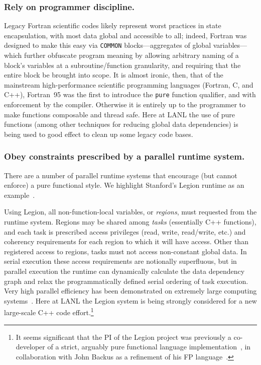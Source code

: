 \documentclass{llncs}
\begin{document}
\subsubsection{Rely on programmer discipline.}
Legacy Fortran scientific codes likely represent worst practices in state
encapsulation, with most data global and accessible to all; indeed, Fortran
was designed to make this easy via \texttt{COMMON} blocks---aggregates of
global variables---which further obfuscate program meaning by allowing
arbitrary naming of a block's variables at a subroutine/function granularity,
and requiring that the entire block be brought into scope.  It is almost
ironic, then, that of the mainstream high-performance scientific programming
languages (Fortran, C, and C++), Fortran~95 was the first to introduce the
\texttt{pure} function qualifier, and with enforcement by the compiler.
Otherwise it is entirely up to the programmer to make functions composable and
thread safe.  Here at LANL the use of pure functions (among other techniques
for reducing global data dependencies) is being used to good effect to clean
up some legacy code bases.

\subsubsection{Obey constraints prescribed by a parallel runtime system.}
There are a number of parallel runtime systems that encourage (but cannot
enforce) a pure functional style.  We highlight Stanford's Legion
runtime as an example~\cite{Bauer12}.

Using Legion, all non-function-local variables, or \emph{regions}, must
requested from the runtime system.  Regions may be shared among \emph{tasks}
(essentially C++ functions), and each task is prescribed access privileges
(read, write, read/write, etc.) and coherency requirements for each region to
which it will have access.  Other than registered access to regions, tasks
must not access non-constant global data.  In serial execution these access
requirements are notionally superfluous, but in parallel execution the runtime
can dynamically calculate the data dependency graph and relax the
programmatically defined serial ordering of task execution.  Very high
parallel efficiency has been demonstrated on extremely large computing
systems~\cite{Bauer14}.  Here at LANL the Legion system is being strongly
considered for a new large-scale C++ code effort.\footnote{It seems
  significant that the PI of the Legion project was previously a co-developer
  of a strict, arguably pure functional language
  implementation~\cite{AikenFL,FLreport89}, in collaboration with John Backus
  as a refinement of his FP language~\cite{Backus:1978}.}
\end{document}

